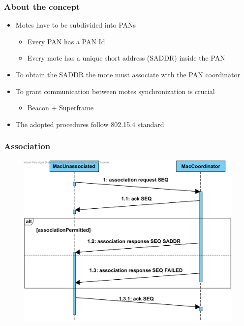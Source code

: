 \begin{frame}[fragile]
  \frametitle{About the concept}
  \begin{itemize}
    \item Motes have to be subdivided into PANs
    \begin{itemize}
    	\item Every PAN has a PAN Id
    	\item Every mote has a unique short address (SADDR) inside the PAN
    \end{itemize}
    \item To obtain the SADDR the mote must associate with the PAN coordinator
    \item To grant communication between motes synchronization is crucial
    \begin{itemize}
      \item Beacon + Superframe
    \end{itemize}
    \item The adopted procedures follow 802.15.4 standard
  \end{itemize}
\end{frame}

\begin{frame}[fragile]
  \frametitle{Association}
  \begin{figure}
    \centering
    \includegraphics[width=.8\textwidth]{img/Association.png}
  \end{figure}
\end{frame}

